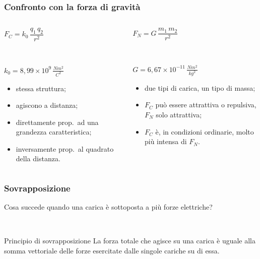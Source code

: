 \documentclass[]{beamer}
\theoremstyle{plain}
\begin{document}
\begin{frame}
\frametitle{Confronto con la forza di gravità}

\begin{columns}
\begin{column}{0.5\textwidth}
\begin{center}
\colorbox{blue!30}{$ F_C = k_0 \,  \dfrac{q_1 \, q_2}{r^2} $}

~

$ k_0 = 8,99 \times 10^9 \, \frac{Nm^2}{C^2}$
\end{center}
\begin{itemize}
  \item<2-> \alert<2>{stessa struttura};
  \item<3-> \alert<3>{agiscono a distanza};
  \item<4-> \alert<4>{direttamente prop.~ad una grandezza caratteristica};
  \item<5-> \alert<5>{inversamente prop.~al quadrato della distanza}.
\end{itemize}
\end{column}
\begin{column}{0.5\textwidth}
\begin{center}
\colorbox{blue!30}{$ F_N = G \,  \dfrac{m_1 \, m_2}{r^2} $}

~

$ G = 6,67 \times 10^{-11} \, \frac{Nm^2}{kg^2}$
\end{center}
\begin{itemize}
  \item<6-> \alert<6>{due tipi di carica, un tipo di massa};
  \item<7-> \alert<7>{$ F_C $ può essere attrattiva o repulsiva, $ F_N $ solo attrattiva};
  \item<8-> \alert<8>{$ F_C $ è, in condizioni ordinarie, molto più intensa di $ F_N $}.
\end{itemize}
\end{column}
\end{columns}
\end{frame}



\begin{frame}
\frametitle{Sovrapposizione}
Cosa succede quando una carica è sottoposta a più forze elettriche?\pause

~

\begin{block}{Principio di sovrapposizione}
La forza totale che agisce su una carica è uguale alla \alert{somma vettoriale} delle forze esercitate dalle singole cariche su di essa.
\end{block}

\end{frame}
\end{document}
